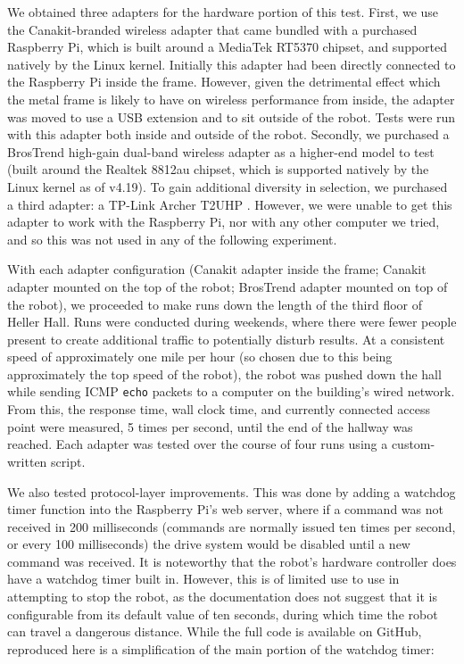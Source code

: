 \documentclass{IEEEtran}
\begin{document}
We obtained three adapters for the hardware portion of this test. First, we
use the Canakit-branded wireless adapter that came bundled with a purchased
Raspberry Pi\cite{canakit}, which is built around a MediaTek RT5370 chipset,
and supported natively by the Linux kernel. Initially this adapter had been
directly connected to the Raspberry Pi inside the frame. However, given the
detrimental effect which the metal frame is likely to have on wireless 
performance from inside, the adapter was moved to use a USB extension and to
sit outside of the robot. Tests were run with this adapter both inside and
outside of the robot. Secondly, we purchased a BrosTrend high-gain dual-band
wireless adapter as a higher-end model to test\cite{brostrend} (built around
the Realtek 8812au chipset, which is supported natively by the Linux kernel
as of v4.19). To gain additional diversity in selection, we
purchased a third adapter: a TP-Link Archer T2UHP \cite{archer}. However,
we were unable to get this adapter to work with the Raspberry Pi, nor with
any other computer we tried, and so this was not used in any of the following
experiment.

With each adapter configuration (Canakit adapter inside the frame; Canakit
adapter mounted on the top of the robot; BrosTrend adapter mounted on top
of the robot), we proceeded to make runs down the length of the third
floor of Heller Hall. Runs were conducted during weekends, where there were
fewer people present to create additional traffic to potentially disturb
results. At a consistent speed of approximately one mile per hour (so chosen
due to this being approximately the top speed of the robot), the robot was
pushed down the hall while sending ICMP \texttt{echo} packets to a computer
on the building's wired network. From this, the response time, wall clock
time, and currently connected access point were measured, 5 times per second,
until the end of the hallway was reached. Each adapter was tested over the
course of four runs using a custom-written script\cite{hallway-script}.

We also tested protocol-layer improvements. This was done by adding a
watchdog timer function\cite{watchdog} into the Raspberry Pi's web server,
where if a command was not received in 200 milliseconds (commands are
normally issued ten times per second, or every 100 milliseconds) the drive
system would be disabled until a new command was received. It is noteworthy
that the robot's hardware controller does have a watchdog timer built in. 
However, this is of limited use to use in attempting to stop the robot, as
the documentation does not suggest that it is configurable from its default
value of ten seconds, during which time the robot can travel a dangerous
distance. While the full code is available on GitHub\cite{watchdog},
reproduced here is a simplification of the main portion of the watchdog timer:
\end{document}
